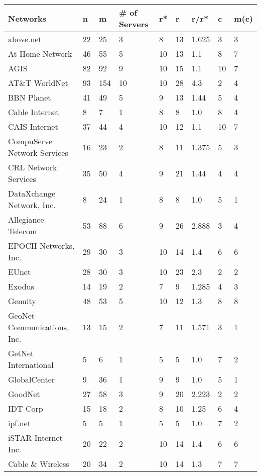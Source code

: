 \documentclass [12pt]{article}
\begin{document}
  \begin{tabular}{ | l | l | l | l | l | l | l | l | l |  }
    \hline
    Networks & n & m &\# of Servers & r* & r & r/r* & c & m(c) \\ \hline
    above.net & 22 & 25 & 3 & 8 & 13 & 1.625 & 3 & 3\\ \hline
    At Home Network & 46 & 55 & 5 & 10 & 13 & 1.1 & 8 & 7\\ \hline
    AGIS & 82 & 92 & 9 & 10 & 15 & 1.1 & 10 & 7\\ \hline
    AT\&T WorldNet & 93 & 154 & 10 & 10 & 28 & 4.3 & 2 & 4\\ \hline
    BBN Planet & 41 & 49 & 5 & 9 & 13 & 1.44 & 5 & 4\\ \hline
    Cable Internet & 8 & 7 & 1 & 8 & 8 & 1.0 & 8 & 4\\ \hline
    CAIS Internet & 37 & 44 & 4 & 10 & 12 & 1.1 & 10 & 7\\ \hline
    CompuServe Network Services & 16 & 23 & 2 & 8 & 11 & 1.375 & 5 & 3\\ \hline
    CRL Network Services & 35 & 50 & 4 & 9 & 21 & 1.44 & 4 & 4\\ \hline
    DataXchange Network, Inc. & 8 & 24 & 1 & 8 & 8 & 1.0 & 5 & 1\\ \hline
    Allegiance Telecom & 53 & 88 & 6 & 9 & 26 & 2.888 & 3 & 4\\ \hline
    EPOCH Networks, Inc. & 29 & 30 & 3 & 10 & 14 & 1.4 & 6 & 6\\ \hline
    EUnet & 28 & 30 & 3 & 10 & 23 & 2.3 & 2 & 2\\ \hline
    Exodus & 14 & 19 & 2 & 7 & 9 & 1.285 & 4 & 3\\ \hline
    Genuity & 48 & 53 & 5 & 10 & 12 & 1.3 & 8 & 8\\ \hline
    GeoNet Communications, Inc. & 13 & 15 & 2 & 7 & 11 & 1.571& 3 & 1\\ \hline
    GetNet International & 5 & 6 & 1 & 5 & 5 & 1.0 & 7 & 2\\ \hline
    GlobalCenter & 9 & 36 & 1 & 9 & 9 & 1.0 & 5 & 1\\ \hline
    GoodNet & 27 & 58 & 3 & 9 & 20 & 2.223 & 2 & 2\\ \hline
    IDT Corp & 15 & 18 & 2 & 8 & 10 & 1.25 & 6 & 4\\ \hline
    ipf.net & 5 & 5 & 1 & 5 & 5 & 1.0 & 7 & 2\\ \hline
    iSTAR Internet Inc. & 20 & 22 & 2 & 10 & 14 & 1.4 & 6 & 6\\ \hline
    Cable \& Wireless & 20 & 34 & 2 & 10 & 14 & 1.3 & 7 & 7\\ \hline

\end{tabular}
\end{document}
